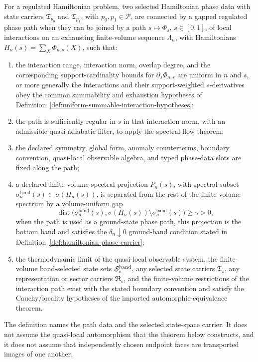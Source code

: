 \begin{definition}
\label{def:gauge-theory-phase}
\label{def:gapped-regulated-phase-equivalence}
For a regulated Hamiltonian problem, two selected Hamiltonian phase data with
state carriers \(\mathfrak T_{p_0}\) and \(\mathfrak T_{p_1}\), with
\(p_0,p_1\in\mathcal P\), are connected by a gapped regulated phase path when
they can be joined by a path
\(s\mapsto \Phi_s\), \(s\in[0,1]\), of local interactions on an exhausting
finite-volume sequence \(\Lambda_n\), with Hamiltonians
\(H_n(s)=\sum_X\Phi_{n,s}(X)\), such that:
\begin{enumerate}
\item the interaction range, interaction norm, overlap degree, and the
  corresponding support-cardinality bounds for \(\partial_s\Phi_{n,s}\) are
  uniform in \(n\) and \(s\), or more generally the interactions and their
  support-weighted \(s\)-derivatives obey the common summability and
  exhaustion hypotheses of
  Definition~\ref{def:uniform-summable-interaction-hypotheses};
\item the path is sufficiently regular in \(s\) in that interaction norm, with
  an admissible quasi-adiabatic filter, to apply the spectral-flow theorem;
\item the declared symmetry, global form, anomaly counterterms, boundary
  convention, quasi-local observable algebra, and typed phase-data slots are
  fixed along the path;
\item a declared finite-volume spectral projection \(P_n(s)\), with spectral
  subset \(\sigma^{\mathrm{band}}_n(s)\subset\sigma(H_n(s))\), is separated
  from the rest of the finite-volume spectrum by a volume-uniform gap
  \[
    \operatorname{dist}\bigl(\sigma^{\mathrm{band}}_n(s),
    \sigma(H_n(s))\setminus\sigma^{\mathrm{band}}_n(s)\bigr)\ge \gamma>0 ;
  \]
  when the path is used as a ground-state phase path, this projection is the
  bottom band and satisfies the \(\delta_n\downarrow0\) ground-band condition
  stated in Definition~\ref{def:hamiltonian-phase-carrier};
\item the thermodynamic limit of the quasi-local observable system, the
  finite-volume band-selected state sets \(\mathcal S_s^{\rm band}\), any
  selected state carriers \(\mathfrak T_s\), any representation or sector
  carriers \(\mathfrak R_s\), and the finite-volume restrictions of the
  interaction path exist with the stated boundary convention and satisfy the
  Cauchy/locality hypotheses of the imported automorphic-equivalence theorem.
\end{enumerate}
The definition names the path data and the selected state-space carrier.  It
does not assume the quasi-local automorphism that the theorem below constructs,
and it does not assume that independently chosen endpoint faces are transported
images of one another.
\end{definition}

